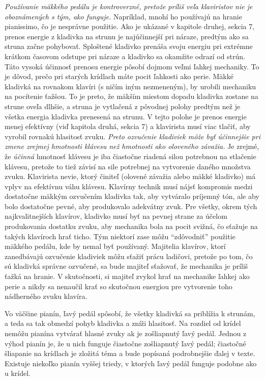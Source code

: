 \emph{Používanie mäkkého pedálu je kontroverzné, pretože príliš veľa klaviristov nie je oboznámených s tým, ako funguje.} Napríklad, mnohí ho používajú na hranie pianissimo, čo je nesprávne použitie. Ako je ukázané v kapitole druhej, sekcia 7, prenos energie z kladivka na strunu je najúčinnejší pri náraze, predtým ako sa struna začne pohybovať. Sploštené kladivko prenáša svoju energiu pri extrémne krátkom časovom odstupe pri náraze a kladivko sa okamžite odrazí od strún. Táto vysoká účinnosť prenosu energie pôsobí dojmom veľmi ľahkej mechaniky. To je dôvod, prečo pri starých krídlach máte pocit ľahkosti ako perie. Mäkké kladivká na rovnakom klavíri (s ničím iným nezmeneným), by urobili mechaniku na pocítenie ťažšou. To je preto, že mäkším miestom dopadu kladivka zostane na strune oveľa dlhšie, a struna je vytlačená z pôvodnej polohy predtým než je všetka energia kladivka prenesená na strunu. V tejto polohe je prenos energie menej efektívny (viď kapitola druhá, sekcia 7) a klavirista musí viac tlačiť, aby vyrobil rovnakú hlasitosť zvuku. \emph{Preto ozvučenie kladiviek môže byť účinnejšie pri zmene zrejmej hmotnosti klávesu než hmotnosti ako oloveného závažia.} Je zrejmé, že \textit{účinná} hmotnosť klávesu je iba čiastočne riadená silou potrebnou na stlačenie klávesu, pretože to tiež závisí na sile potrebnej na vytvorenie daného množstva zvuku. Klavirista nevie, ktorý činiteľ (olovené závažia alebo mäkké kladivko) má vplyv na efektívnu váhu klávesu. Klavírny technik musí nájsť kompromis medzi dostatočne mäkkým ozvučením kladivka tak, aby vytváralo príjemný tón, ale aby bolo dostatočne pevné, aby produkovalo adekvátny zvuk. Pre všetky, okrem tých najkvalitnejších klavírov, kladivko musí byť na pevnej strane za účelom produkovania dostatku zvuku, aby mechanika bola na pocit svižná, čo sťažuje na takých klavíroch hrať ticho. Tým niektorí zase môžu “zdôvodniť” použitie mäkkého pedálu, kde by nemal byť používaný. Majitelia klavírov, ktorí zanedbávajú ozvučenie kladiviek môžu sťažiť prácu ladičovi, pretože po tom, čo sú kladivká správne ozvučené, sa bude majiteľ sťažovať, že mechanika je príliš ťažká na hranie. V skutočnosti, si majiteľ zvykol hrať na mechanike ľahkej ako perie a nikdy sa nenaučil krať so skutočnou energiou pre vytvorenie toho nádherného zvuku klavíra.

Vo väčšine pianín, ľavý pedál spôsobí, že všetky kladivká sa priblížia k strunám, a teda sa tak obmedzí pohyb kladivka a zníži hlasitosť. Na rozdiel od krídel nemôžu pianína vytvárať hlasné zvuky ak je zošliapnutý ľavý pedál. Jednou z výhod pianín je, že u nich funguje čiastočne zošliapnutý ľavý pedál; čiastočné šliapanie na krídlach je zložitá téma a bude popísaná podrobnejšie ďalej v texte. Existuje niekoľko pianín vyššej triedy, v ktorých ľavý pedál funguje podobne ako u krídel.

